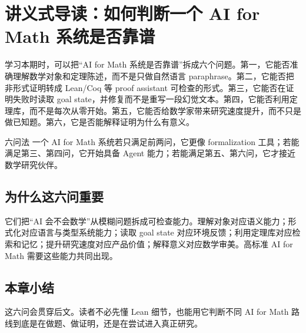 \section{讲义式导读：如何判断一个 AI for Math 系统是否靠谱}

学习本期时，可以把“AI for Math 系统是否靠谱”拆成六个问题。第一，它能否准确理解数学对象和定理陈述，而不是只做自然语言 paraphrase。第二，它能否把非形式证明转成 Lean/Coq 等 proof assistant 可检查的形式。第三，它能否在证明失败时读取 goal state，并修复而不是重写一段幻觉文本。第四，它能否利用定理库，而不是每次从零开始。第五，它能否给数学家带来研究速度提升，而不只是做已知题。第六，它是否能解释证明为什么有意义。

\begin{importantbox}{六问法}
一个 AI for Math 系统若只满足前两问，它更像 formalization 工具；若能满足第三、第四问，它开始具备 Agent 能力；若能满足第五、第六问，它才接近数学研究伙伴。
\end{importantbox}

\subsection{为什么这六问重要}

它们把“AI 会不会数学”从模糊问题拆成可检查能力。理解对象对应语义能力；形式化对应语言与类型系统能力；读取 goal state 对应环境反馈；利用定理库对应检索和记忆；提升研究速度对应产品价值；解释意义对应数学审美。高标准 AI for Math 需要这些能力共同出现。

\subsection{本章小结}

这六问会贯穿后文。读者不必先懂 Lean 细节，也能用它判断不同 AI for Math 路线到底是在做题、做证明，还是在尝试进入真正研究。

